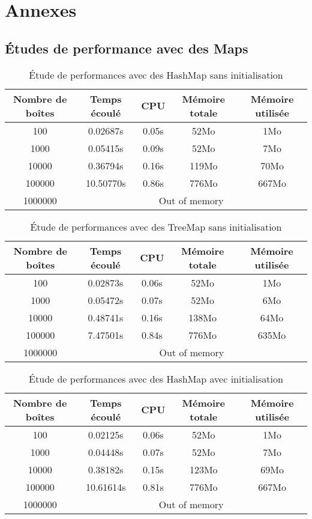 \appendix
\chapter{Annexes}
\section{Études de performance avec des Maps}

\begin{table}[htpb]
  \centering
\begin{tabular}{|c|c|c|c|c|}
\hline
Nombre de boîtes & Temps écoulé & CPU & Mémoire totale & Mémoire utilisée\\
\hline
100 & 0.02687s & 0.05s & 52Mo & 1Mo\\
\hline
1000 & 0.05415s & 0.09s & 52Mo & 7Mo\\
\hline
10000 & 0.36794s & 0.16s & 119Mo & 70Mo\\
\hline
100000 & 10.50770s & 0.86s & 776Mo & 667Mo\\
\hline
1000000 & \multicolumn{4}{|c|}{Out of memory}\\
\hline
\end{tabular}
\caption{Étude de performances avec des HashMap sans initialisation}
\label{tab:hashmap1}
\end{table}

\begin{table}[htbp]
  \centering
\begin{tabular}{|c|c|c|c|c|}
\hline
Nombre de boîtes & Temps écoulé & CPU & Mémoire totale & Mémoire utilisée\\
\hline
100 & 0.02873s & 0.06s & 52Mo & 1Mo\\
\hline
1000 & 0.05472s & 0.07s & 52Mo & 6Mo\\
\hline
10000 & 0.48741s & 0.16s & 138Mo & 64Mo\\
\hline
100000 & 7.47501s & 0.84s & 776Mo & 635Mo\\
\hline
1000000 & \multicolumn{4}{|c|}{Out of memory}\\
\hline
\end{tabular}
\caption{Étude de performances avec des TreeMap sans initialisation}
\label{tab:treemap1}
\end{table}

\begin{table}[htbp]
  \centering
\begin{tabular}{|c|c|c|c|c|}
\hline
Nombre de boîtes & Temps écoulé & CPU & Mémoire totale & Mémoire utilisée\\
\hline
100 & 0.02125s & 0.06s & 52Mo & 1Mo\\
\hline
1000 & 0.04448s & 0.07s & 52Mo & 7Mo\\
\hline
10000 & 0.38182s & 0.15s & 123Mo & 69Mo\\
\hline
100000 & 10.61614s & 0.81s & 776Mo & 667Mo\\
\hline
1000000 & \multicolumn{4}{|c|}{Out of memory}\\
\hline
\end{tabular}
\caption{Étude de performances avec des HashMap avec initialisation}
\label{tab:hashmap2}
\end{table}

